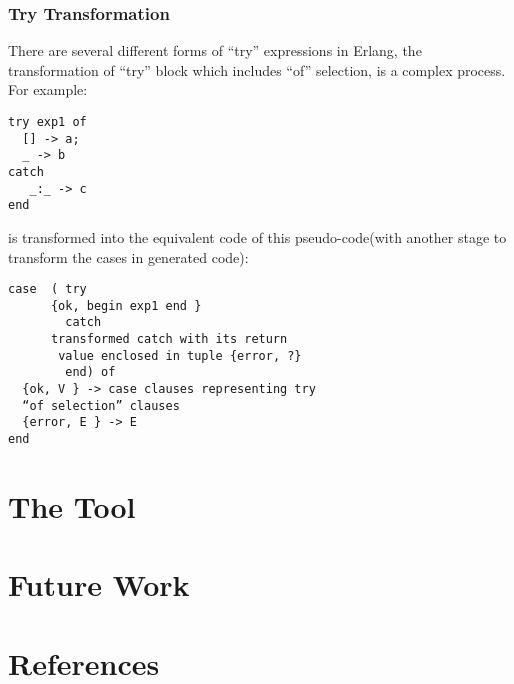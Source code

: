 \documentclass[12pt,a4paper]{report}
\begin{document}
\subsection{Try Transformation}
There are several different forms of “try” expressions in Erlang, the transformation of “try” block which includes “of” selection, is a complex process. For example:
\begin{lstlisting}
try exp1 of 
  [] -> a;
  _ -> b
catch
   _:_ -> c
end
\end{lstlisting}

is transformed into the equivalent code of this pseudo-code(with another stage to transform the cases in generated code):

\begin{lstlisting}
case  ( try
	  {ok, begin exp1 end }
        catch        
	  transformed catch with its return
	   value enclosed in tuple {error, ?}
        end) of
  {ok, V } -> case clauses representing try
  “of selection” clauses
  {error, E } -> E
end
\end{lstlisting}

\chapter{The Tool}
\newpage
\chapter{Future Work}
\newpage
\chapter{References}
\newpage


\end{document}

